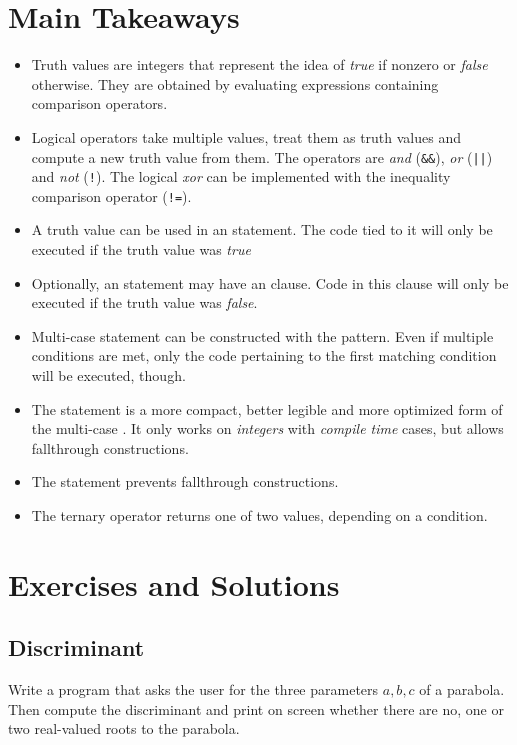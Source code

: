 \section{Main Takeaways}
\begin{defbox}
\begin{itemize}
\item Truth values are integers that represent the idea of \emph{true} if nonzero or \emph{false} otherwise.
	They are obtained by evaluating expressions containing comparison operators.
\item Logical operators take multiple values, treat them as truth values and compute a new truth value from them.
	The operators are \emph{and} (\texttt{\&\&}), \emph{or} (\texttt{||}) and \emph{not} (\texttt{!}).
	The logical \emph{xor} can be implemented with the inequality comparison operator (\texttt{!=}).
\item A truth value can be used in an  statement. The code tied to it will only be executed if the truth value was \emph{true}
\item Optionally, an  statement may have an  clause. Code in this clause will only be executed if the truth value was \emph{false}.
\item Multi-case  statement can be constructed with the  pattern.
	Even if multiple conditions are met, only the code pertaining to the first matching condition will be executed, though.
\item The  statement is a more compact, better legible and more optimized form of the multi-case .
	It only works on \emph{integers} with \emph{compile time} cases, but allows fallthrough constructions.
\item The  statement prevents fallthrough constructions.
\item The ternary operator returns one of two values, depending on a condition.
\end{itemize}
\end{defbox}


\newpage
\section{Exercises and Solutions}
\subsection*{Discriminant}
Write a program that asks the user for the three parameters $a, b, c$ of a parabola. Then compute the discriminant and print on screen whether there are no, one or two real-valued roots to the parabola.

